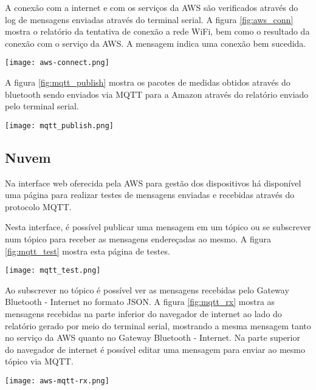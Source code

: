 A conexão com a internet e com os serviços da AWS são verificados através do log
de mensagens enviadas através do terminal serial. A figura \ref{fig:aws_conn}
mostra o relatório da tentativa de conexão a rede WiFi, bem como o resultado da
conexão com o serviço da AWS. A mensagem 
indica uma conexão bem sucedida.

\begin{center}
	\centering 
	\texttt{[image: aws-connect.png]}
	\label{fig:aws_conn}
\end{center} 

A figura \ref{fig:mqtt_publish} mostra os pacotes de medidas obtidos através do
bluetooth sendo enviados via MQTT para a Amazon através do relatório enviado
pelo terminal serial.

\begin{center}
	\centering 
	\texttt{[image: mqtt\_publish.png]}
	\label{fig:mqtt_publish}
\end{center} 

\subsection{Nuvem}

Na interface web oferecida pela AWS para gestão dos dispositivos há disponível
uma página para realizar testes de mensagens enviadas e recebidas através do
protocolo MQTT. 

Nesta interface, é possível publicar uma mensagem em um tópico ou se subscrever
num tópico para receber as mensagens endereçadas ao mesmo. A figura
\ref{fig:mqtt_test} mostra esta página de testes.

\begin{center}
	\centering 
	\texttt{[image: mqtt\_test.png]}
	\label{fig:mqtt_test}
\end{center} 

Ao subscrever no tópico  é possível ver as mensagens
recebidas pelo Gateway Bluetooth - Internet no formato JSON. A figura
\ref{fig:mqtt_rx} mostra as mensagens recebidas na parte inferior do
navegador de internet ao lado do relatório gerado por meio do terminal serial,
mostrando a mesma mensagem tanto no serviço da AWS quanto no Gateway Bluetooth - Internet.
Na parte superior do navegador de internet é possível editar uma mensagem para
enviar ao mesmo tópico via MQTT.

\begin{center}
	\centering 
	\texttt{[image: aws-mqtt-rx.png]}
	\label{fig:mqtt_rx}
\end{center} 